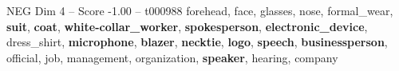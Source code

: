 \begin{textsample}{NEG Dim 4 – Score -1.00 – t000988}  \label{ex:f4_neg_016}
forehead, face, glasses, nose, formal\_wear, \textbf{suit}, \textbf{coat}, \textbf{white-collar\_worker}, \textbf{spokesperson}, \textbf{electronic\_device}, dress\_shirt, \textbf{microphone}, \textbf{blazer}, \textbf{necktie}, \textbf{logo}, \textbf{speech}, \textbf{businessperson}, official, job, management, organization, \textbf{speaker}, hearing, company

\end{textsample}
